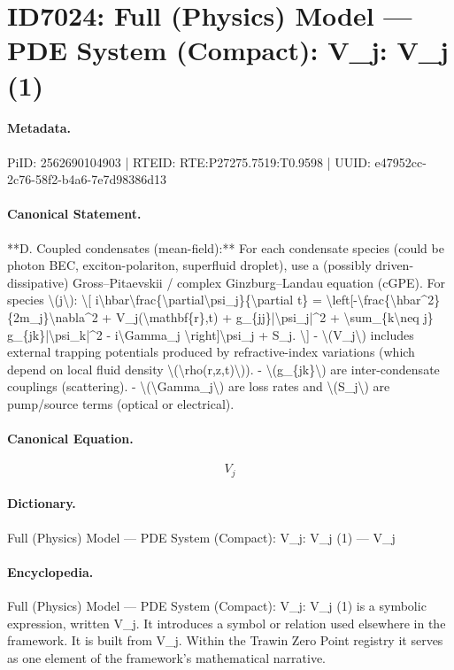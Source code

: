 \section*{ID7024: Full (Physics) Model — PDE System (Compact): V\_j: V\_j (1)}
\paragraph{Metadata.}
PiID: 2562690104903 | RTEID: RTE:P27275.7519:T0.9598 | UUID: e47952cc-2c76-58f2-b4a6-7e7d98386d13

\paragraph{Canonical Statement.}
**D. Coupled condensates (mean-field):** For each condensate species (could be photon BEC, exciton-polariton, superfluid droplet), use a (possibly driven-dissipative) Gross–Pitaevskii / complex Ginzburg–Landau equation (cGPE). For species \textbackslash{}(j\textbackslash{}): \textbackslash{}[ i\textbackslash{}hbar\textbackslash{}frac\{\textbackslash{}partial\textbackslash{}psi\_j\}\{\textbackslash{}partial t\} = \textbackslash{}left[-\textbackslash{}frac\{\textbackslash{}hbar\textasciicircum{}2\}\{2m\_j\}\textbackslash{}nabla\textasciicircum{}2 + V\_j(\textbackslash{}mathbf\{r\},t) + g\_\{jj\}|\textbackslash{}psi\_j|\textasciicircum{}2 + \textbackslash{}sum\_\{k\textbackslash{}neq j\} g\_\{jk\}|\textbackslash{}psi\_k|\textasciicircum{}2 - i\textbackslash{}Gamma\_j \textbackslash{}right]\textbackslash{}psi\_j + S\_j. \textbackslash{}] - \textbackslash{}(V\_j\textbackslash{}) includes external trapping potentials produced by refractive-index variations (which depend on local fluid density \textbackslash{}(\textbackslash{}rho(r,z,t)\textbackslash{})). - \textbackslash{}(g\_\{jk\}\textbackslash{}) are inter-condensate couplings (scattering). - \textbackslash{}(\textbackslash{}Gamma\_j\textbackslash{}) are loss rates and \textbackslash{}(S\_j\textbackslash{}) are pump/source terms (optical or electrical).

\paragraph{Canonical Equation.}
\[
V_j
\]

\paragraph{Dictionary.}
Full (Physics) Model — PDE System (Compact): V\_j: V\_j (1) — V\_j

\paragraph{Encyclopedia.}
Full (Physics) Model — PDE System (Compact): V\_j: V\_j (1) is a symbolic expression, written V\_j. It introduces a symbol or relation used elsewhere in the framework. It is built from V\_j. Within the Trawin Zero Point registry it serves as one element of the framework's mathematical narrative.
